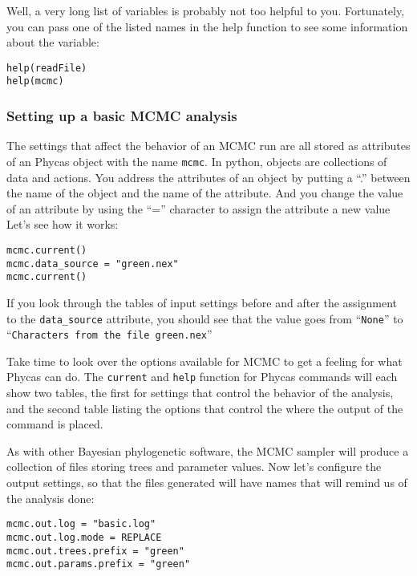 \documentclass{article}
\newcommand{\cmdopt}[1]{\texttt{#1}\xspace}
\newcommand{\cmd}[1]{\texttt{#1}\xspace}
\newcommand{\phycas}{Phycas\xspace}
\begin{document}
Well, a very long list of variables is probably not too helpful to you.
Fortunately, you can pass one of the listed names in the help function to see 
some information about the variable:
\begin{verbatim}
help(readFile)
help(mcmc)
\end{verbatim}

\subsubsection{Setting up a basic MCMC analysis}
The settings that affect the behavior of an MCMC run are all stored
as attributes of an \phycas object with the name \cmd{mcmc}.
In python, objects are collections of data and actions.
You address the attributes of an object by putting a ``.'' between
the name of the object and the name of the attribute.
And you change the value of an attribute by using the ``='' character
to assign the attribute a new value
Let's see how it works:
\begin{verbatim}
mcmc.current()
mcmc.data_source = "green.nex"
mcmc.current()
\end{verbatim}
If you look through the tables of input settings before and after
the assignment to the \cmdopt{data\_source} attribute, you should see
that the value goes from ``\cmd{None}'' to ``\cmd{Characters from the file green.nex}''

Take time to look over the options available for MCMC to get a feeling for
what \phycas can do.
The \cmd{current} and \cmd{help} function for \phycas commands will 
each show two tables, the first for settings that control the behavior
of the analysis, and the second table listing the options that control
the where the output of the command is placed.

As with other Bayesian phylogenetic software, the MCMC sampler will produce a collection of files storing
trees and parameter values.
Now let's configure the output settings, so that the files generated will have names that 
will remind us of the analysis done:
\begin{verbatim}
mcmc.out.log = "basic.log"
mcmc.out.log.mode = REPLACE
mcmc.out.trees.prefix = "green"
mcmc.out.params.prefix = "green"
\end{verbatim}
\end{document}
